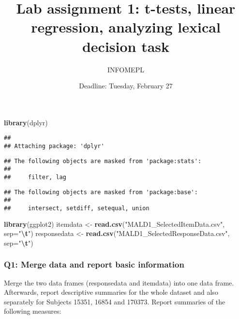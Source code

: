 \documentclass[
]{article}
\title{Lab assignment 1: t-tests, linear regression, analyzing lexical
decision task}
\author{INFOMEPL}
\date{Deadline: Tuesday, February 27}
\newenvironment{Shaded}{\begin{snugshade}}{\end{snugshade}}
\newcommand{\AttributeTok}[1]{\textcolor[rgb]{0.13,0.29,0.53}{#1}}
\newcommand{\FunctionTok}[1]{\textcolor[rgb]{0.13,0.29,0.53}{\textbf{#1}}}
\newcommand{\NormalTok}[1]{#1}
\newcommand{\OtherTok}[1]{\textcolor[rgb]{0.56,0.35,0.01}{#1}}
\newcommand{\SpecialCharTok}[1]{\textcolor[rgb]{0.81,0.36,0.00}{\textbf{#1}}}
\newcommand{\StringTok}[1]{\textcolor[rgb]{0.31,0.60,0.02}{#1}}
\begin{document}
\maketitle

\begin{Shaded}
\begin{Highlighting}[]
\FunctionTok{library}\NormalTok{(dplyr)}
\end{Highlighting}
\end{Shaded}

\begin{verbatim}
## 
## Attaching package: 'dplyr'
\end{verbatim}

\begin{verbatim}
## The following objects are masked from 'package:stats':
## 
##     filter, lag
\end{verbatim}

\begin{verbatim}
## The following objects are masked from 'package:base':
## 
##     intersect, setdiff, setequal, union
\end{verbatim}

\begin{Shaded}
\begin{Highlighting}[]
\FunctionTok{library}\NormalTok{(ggplot2)}
\NormalTok{itemdata }\OtherTok{\textless{}{-}} \FunctionTok{read.csv}\NormalTok{(}\StringTok{"MALD1\_SelectedItemData.csv"}\NormalTok{, }\AttributeTok{sep=}\StringTok{"}\SpecialCharTok{\textbackslash{}t}\StringTok{"}\NormalTok{)}
\NormalTok{responsedata }\OtherTok{\textless{}{-}} \FunctionTok{read.csv}\NormalTok{(}\StringTok{"MALD1\_SelectedResponseData.csv"}\NormalTok{, }\AttributeTok{sep=}\StringTok{"}\SpecialCharTok{\textbackslash{}t}\StringTok{"}\NormalTok{)}
\end{Highlighting}
\end{Shaded}

\hypertarget{q1-merge-data-and-report-basic-information}{%
\subsubsection{Q1: Merge data and report basic
information}\label{q1-merge-data-and-report-basic-information}}

Merge the two data frames (responsedata and itemdata) into one data
frame. Afterwards, report descriptive summaries for the whole dataset
and also separately for Subjects 15351, 16854 and 170373. Report
summaries of the following measures:
\end{document}
